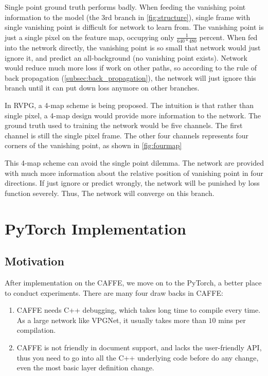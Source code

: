 \begin{spacing}{1.5}
Single point ground truth performs badly. When feeding the vanishing point information to the model (the  $3$rd branch in \autoref{fig:structure}), single frame with single vanishing point is difficult for network to learn from. The vanishing point is just a single pixel on the feature map, occupying only $\frac{1}{640*480}$ percent. When fed into the network directly, the vanishing point is so small that network would just ignore it, and predict an all-background (no vanishing point exists). Network would reduce much more loss if work on other paths, so according to the rule of back propagation (\autoref{subsec:back_propagation}), the network will just ignore this branch until it can put down loss anymore on other branches.

In RVPG, a 4-map scheme is being proposed. The intuition is that rather than single pixel, a 4-map design would provide more information to the network. The ground truth used to training the network would be five channels. The first channel is still the single pixel frame. The other four channels represents four corners of the vanishing point, as shown in \autoref{fig:fourmap}

This 4-map scheme can avoid the single point dilemma. The network are provided with much more information about the relative position of vanishing point in four directions. If just ignore or predict wrongly, the network will be punished by loss function severely. Thus, The network will converge on this branch.

\section{PyTorch Implementation}
\label{sec:MD_PyTorch}

\subsection{Motivation}

After implementation on the CAFFE, we move on to the PyTorch, a better place to conduct experiments. There are many four draw backs in CAFFE: 

\begin{enumerate}

    \item CAFFE needs C++ debugging, which takes long time to compile every time. As a large network like VPGNet, it usually takes more than $10$ mins per compilation.

    \item CAFFE is not friendly in document support, and lacks the user-friendly API, thus you need to go into all the C++ underlying code before do any change, even the most basic layer definition change. 


\end{enumerate}
\end{spacing}
